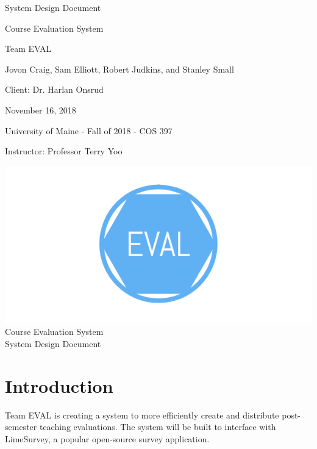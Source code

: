\documentclass{article}
\begin{document}
\begin{titlepage}


\centering
\vspace*{2cm}
{\Huge System Design Document\par}
\vspace{.25cm}
{\LARGE Course Evaluation System\par}
\vspace{1cm}
{\Large Team EVAL\par}
\vspace{.2cm}
{\Large Jovon Craig, Sam Elliott, Robert Judkins, and Stanley Small\par}
\vspace{1cm}
{\Large Client: Dr. Harlan Onsrud\par}
\vspace{1cm}
{\Large November 16, 2018\par}
\vspace{11cm}

University of Maine - Fall of 2018 - COS 397

Instructor: Professor Terry Yoo

\end{titlepage}

\newpage

\begin{center}
{\includegraphics[scale=.2]{images/team_logo.png}} \\ 	\bigskip
{\LARGE Course Evaluation System } \\ \medskip
{\large System Design Document } \\ \medskip
\end{center}

\tableofcontents

\newpage

\section{Introduction}
Team EVAL is creating a system to more efficiently create and distribute post-semester teaching evaluations. The system will be built to interface with LimeSurvey, a popular open-source survey application. 
\end{document}
